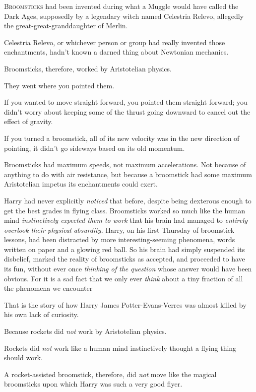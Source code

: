 
\lettrine{B}{roomsticks} had
been invented during what a Muggle would have called the Dark Ages, supposedly
by a legendary witch named Celestria Relevo, allegedly the
great-great-granddaughter of Merlin.

Celestria Relevo, or whichever person or group had really invented those
enchantments, hadn't known a darned thing about Newtonian mechanics.

Broomsticks, therefore, worked by Aristotelian physics.

They went where you pointed them.

If you wanted to move straight forward, you pointed them straight forward; you
didn't worry about keeping some of the thrust going downward to cancel out the
effect of gravity.

If you turned a broomstick, all of its new velocity was in the new direction of
pointing, it didn't go sideways based on its old momentum.

Broomsticks had maximum speeds, not maximum accelerations. Not because of
anything to do with air resistance, but because a broomstick had some maximum
Aristotelian impetus its enchantments could exert.

Harry had never explicitly \emph{noticed} that before, despite being dexterous
enough to get the best grades in flying class. Broomsticks worked so much like
the human mind \emph{instinctively expected them to work} that his brain had
managed to \emph{entirely overlook their physical absurdity.} Harry, on his
first Thursday of broomstick lessons, had been distracted by more
interesting-seeming phenomena, words written on paper and a glowing red ball.
So his brain had simply suspended its disbelief, marked the reality of
broomsticks as accepted, and proceeded to have its fun, without ever once
\emph{thinking of the question} whose answer would have been obvious. For it is
a sad fact that we only ever \emph{think} about a tiny fraction of all the
phenomena we encounter{\el}

That is the story of how Harry James Potter-Evans-Verres was almost killed by
his own lack of curiosity.

Because rockets did \emph{not} work by Aristotelian physics.

Rockets did \emph{not} work like a human mind instinctively thought a flying
thing should work.

A rocket-assisted broomstick, therefore, did \emph{not} move like the magical
broomsticks upon which Harry was such a very good flyer.

